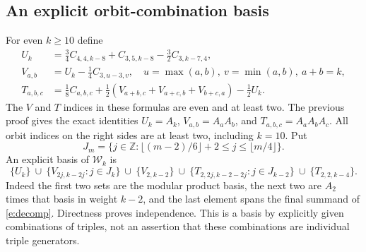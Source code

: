 \documentclass[12pt]{amsart}
\theoremstyle{definition}
\theoremstyle{remark}
\numberwithin{equation}{section}
\newcommand{\Z}{\mathbb{Z}}
\newcommand{\WW}{\mathcal W}
\numberwithin{equation}{section}
\begin{document}
\subsection{An explicit orbit-combination basis}\label{e:basis}
For even $k\ge10$ define
\begin{align}
 U_k&=\tfrac34 C_{4,4,k-8}+C_{3,5,k-8}-\tfrac32 C_{3,k-7,4},\label{e:U}\\
 V_{a,b}&=U_k-\tfrac14 C_{3,u-3,v},\quad
 u=\max(a,b),\ v=\min(a,b),\ a+b=k,\label{e:V}\\
 T_{a,b,c}&=\tfrac18 C_{a,b,c}
  +\tfrac12(V_{a+b,c}+V_{a+c,b}+V_{b+c,a})-\tfrac12 U_k.
 \label{e:T}
\end{align}
The $V$ and $T$ indices in these formulas are even and at least two.
The previous proof gives the exact identities
$U_k=A_k$, $V_{a,b}=A_aA_b$, and $T_{a,b,c}=A_aA_bA_c$.
All orbit indices on the right sides are at least two, including $k=10$.
Put
\[
 J_m=\{j\in\Z:\lfloor(m-2)/6\rfloor+2\le j\le\lfloor m/4\rfloor\}.
\]
An explicit basis of $\WW_k$ is
\begin{equation}\label{e:basisformula}
 \{U_k\}\ \cup\ \{V_{2j,k-2j}:j\in J_k\}
 \ \cup\ \{V_{2,k-2}\}
 \ \cup\ \{T_{2,2j,k-2-2j}:j\in J_{k-2}\}
 \ \cup\ \{T_{2,2,k-4}\}.
\end{equation}
Indeed the first two sets are the modular product basis, the next two are
$A_2$ times that basis in weight $k-2$, and the last element spans the final
summand of \eqref{e:decomp}. Directness proves independence. This is a basis
by explicitly given combinations of triples, not an assertion that these
combinations are individual triple generators.
\end{document}
